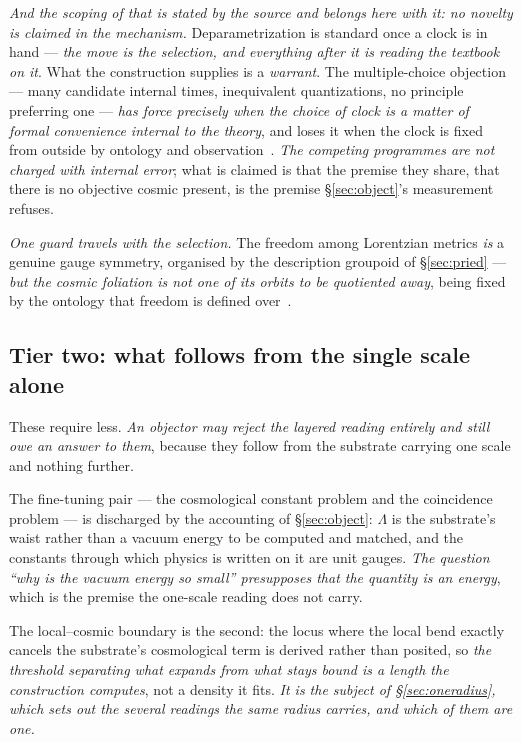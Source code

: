 \documentclass[11pt,a4paper]{article}
\theoremstyle{plain}
\theoremstyle{definition}
\begin{document}
\emph{And the scoping of that is stated by the source and belongs here with it: no novelty is claimed
in the mechanism.} Deparametrization is standard once a clock is in hand --- \emph{the move is the selection,
and everything after it is reading the textbook on it}. What the construction supplies is a
\emph{warrant}. The multiple-choice objection --- many candidate internal times, inequivalent quantizations,
no principle preferring one --- \emph{has force precisely when the choice of clock is a matter of formal
convenience internal to the theory}, and loses it when the clock is fixed from outside by ontology and
observation~\cite{JanzenCanonicalTime}. \emph{The competing programmes are not charged with internal error};
what is claimed is that the premise they share, that there is no objective cosmic present, is the premise
\S\ref{sec:object}'s measurement refuses.

\emph{One guard travels with the selection.} The freedom among Lorentzian metrics \emph{is} a genuine gauge
symmetry, organised by the description groupoid of \S\ref{sec:pried} --- \emph{but the cosmic foliation is not
one of its orbits to be quotiented away}, being fixed by the ontology that freedom is defined
over~\cite{JanzenCanonicalTime}.

\subsection{Tier two: what follows from the single scale alone}

These require less. \emph{An objector may reject the layered reading entirely and still owe an answer to
them}, because they follow from the substrate carrying one scale and nothing further.

The fine-tuning pair --- the cosmological constant problem and the coincidence problem --- is discharged by
the accounting of \S\ref{sec:object}: $\Lambda$ is the substrate's waist rather than a vacuum energy to be
computed and matched, and the constants through which physics is written on it are unit gauges. \emph{The
question ``why is the vacuum energy so small'' presupposes that the quantity is an energy}, which is the
premise the one-scale reading does not carry.

The local--cosmic boundary is the second: the locus where the local bend exactly cancels the substrate's
cosmological term is derived rather than posited, so \emph{the threshold separating what expands from what
stays bound is a length the construction computes}, not a density it fits. \emph{It is the subject of
\S\ref{sec:oneradius}, which sets out the several readings the same radius carries, and which of them are one.}
\end{document}
